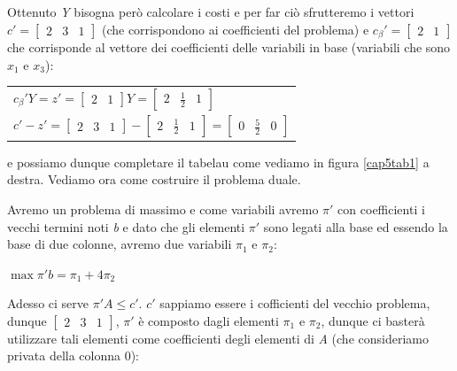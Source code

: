 \documentclass[11pt]{book}
\begin{document}
Ottenuto {\em Y} bisogna per\`o calcolare i costi e per far ci\`o
sfrutteremo i vettori $c' = \begin{bmatrix}2 & 3 & 1\end{bmatrix}$
  (che corrispondono ai coefficienti del problema) e $c_\beta'
  = \begin{bmatrix}2 &1 \end{bmatrix}$ che corrisponde al vettore dei
  coefficienti delle variabili in base (variabili che sono $x_1$ e
  $x_3$):

\vspace{11pt}
\begin{center}
\begin{tabular}{l}
$c_\beta'Y = z' = \begin{bmatrix}2 & 1\end{bmatrix}Y
    = \begin{bmatrix}2 & \frac{1}{2}& 1\end{bmatrix}$ \\
$c' - z' = \begin{bmatrix}2 & 3 & 1\end{bmatrix} - \begin{bmatrix}2 &
          \frac{1}{2} & 1\end{bmatrix} = \begin{bmatrix}0 &
            \frac{5}{2} & 0\end{bmatrix}$
\end{tabular}
\end{center}
\vspace{11pt}

e possiamo dunque completare il tabelau come vediamo in figura
\ref{cap5tab1} a destra. Vediamo ora come costruire il problema duale.

Avremo un problema di massimo e come variabili avremo $\pi'$ con
coefficienti i vecchi termini noti {\em b} e dato che gli elementi
$\pi'$ sono legati alla base ed essendo la base di due colonne, avremo
due variabili $\pi_1$ e $\pi_2$:

\begin{center}
$\max \pi'b = \pi_1 + 4 \pi_2$
\end{center}

Adesso ci serve $\pi'A \leq c'$. $c'$ sappiamo essere i cofficienti
del vecchio problema, dunque $\begin{bmatrix}2 & 3 & 1\end{bmatrix}$,
  $\pi'$ \`e composto dagli elementi $\pi_1$ e $\pi_2$, dunque ci
  baster\`a utilizzare tali elementi come coefficienti degli elementi
  di {\em A} (che consideriamo privata della colonna 0):
\end{document}
